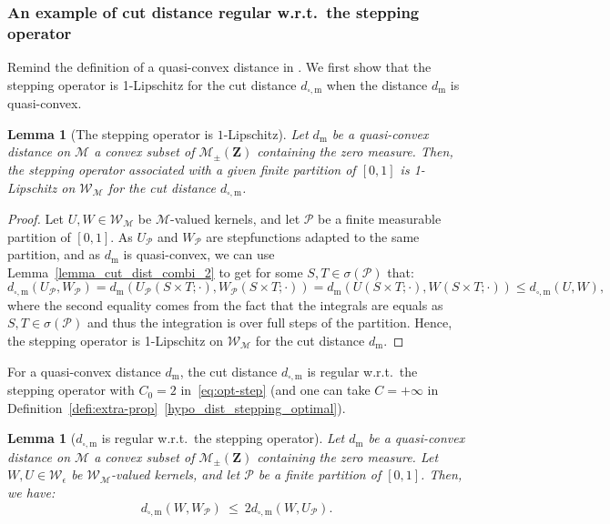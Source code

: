 \documentclass{amsart}
\newcommand{\wrt}{w.r.t.\ }
\theoremstyle{plain}
\newtheorem{lemme}[Th]{Lemma}
\theoremstyle{definition}
\newcommand{\Space}{\mathbf{Z}}
\newcommand{\cm}{\mathcal{M}}
\newcommand{\cp}{\mathcal{P}}
\newcommand{\cM}{\mathcal{M}}
\newcommand{\cP}{\mathcal{P}}
\newcommand{\SignedMeas}{\mathcal{M}_{\pm}(\Space)}
\newcommand{\KernelM}{\mathcal{W}_\cm}
\newcommand{\KernelEps}{\mathcal{W}_{\epsilon}}
\newcommand{\m}{\mathrm{m}}
\newcommand{\dmeas}{d_\m}
\newcommand{\dcut}{d_{\square,\m}}
\begin{document}
\subsubsection{An example of cut distance regular \wrt  the
    stepping  operator}



Remind the definition of a quasi-convex distance in .
We first show that the stepping operator is 1-Lipschitz  for the cut distance $\dcut$
when the distance $\dmeas$ is quasi-convex.


\begin{lemme}[The stepping operator is $1$-Lipschitz]
	\label{contractivity_2}
 Let $\dmeas$ be a quasi-convex distance on $\cM$ a convex subset of $\SignedMeas$ containing the zero measure.
Then, the stepping operator associated with a given finite partition of
$[0, 1]$ is 1-Lipschitz  on $\KernelM$ for the cut distance $\dcut$.
\end{lemme}

\begin{proof}
Let $U,W\in\KernelM$ be $\cM$-valued kernels, and let $\mathcal{P}$ 
be a finite measurable partition of $[0,1]$.
As $U_\mathcal{P}$ and $W_\mathcal{P}$ are stepfunctions adapted to the same partition,
and as $\dmeas$ is quasi-convex,
we can use  Lemma~\ref{lemma_cut_dist_combi_2} 
to get for some $S, T\in\sigma(\cp)$ that:
\[
\dcut(U_\mathcal{P}, W_\mathcal{P})  = \dmeas(U_\mathcal{P}(S\times T;\cdot), W_\mathcal{P}(S\times T;\cdot))
= \dmeas(U(S\times T;\cdot), W(S\times T;\cdot))
\leq \dcut(U,W),
\]
where the  second equality comes  from the  fact that the  integrals are
equals as  $S, T  \in \sigma(\mathcal{P})$ and  thus the  integration is
over full  steps of the partition.  
Hence, the stepping  operator is 1-Lipschitz  on $\KernelM$ for the cut distance $\dmeas$.
\end{proof}

For a quasi-convex distance $\dmeas$, the cut distance $\dcut$
is regular \wrt the stepping operator with  $C_0=2$
in~\eqref{eq:opt-step} (and one can take $C=+\infty$ 
	in Definition~\ref{defi:extra-prop}~\ref{hypo_dist_stepping_optimal}).
	
\begin{lemme}[$\dcut$ is regular \wrt the stepping operator]\label{lemma_step_opti_2}
Let $\dmeas$ be a quasi-convex distance on $\cM$ a convex subset of $\SignedMeas$ containing the zero measure.
Let $W, U\in \KernelEps$ be $\KernelM$-valued kernels,
and let  $\mathcal{P}$ be a finite  partition of $[0,1]$. 
Then, we have:
\[
  \dcut(W, W_\cP) \ \leq\ 2 \dcut(W, U_\cp) .
\]
\end{lemme}
\end{document}
